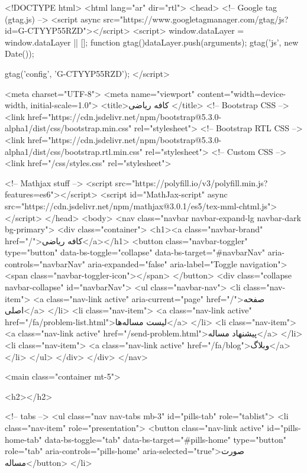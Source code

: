 <!DOCTYPE html>
<html lang="ar" dir="rtl">
<head>
      <!-- Google tag (gtag.js) -->
      <script async src="https://www.googletagmanager.com/gtag/js?id=G-CTYYP55RZD"></script>
      <script>
        window.dataLayer = window.dataLayer || [];
        function gtag(){dataLayer.push(arguments);}
        gtag('js', new Date());

        gtag('config', 'G-CTYYP55RZD');
      </script>

    <meta charset="UTF-8">
    <meta name="viewport" content="width=device-width, initial-scale=1.0">
    <title>کافه ریاضی
    </title>
    <!-- Bootstrap CSS -->
    <link href="https://cdn.jsdelivr.net/npm/bootstrap@5.3.0-alpha1/dist/css/bootstrap.min.css" rel="stylesheet">
    <!-- Bootstrap RTL CSS -->
    <link href="https://cdn.jsdelivr.net/npm/bootstrap@5.3.0-alpha1/dist/css/bootstrap.rtl.min.css" rel="stylesheet">
    <!-- Custom CSS -->
    <link href="/css/styles.css" rel="stylesheet">

    <!-- Mathjax stuff -->
    <script src="https://polyfill.io/v3/polyfill.min.js?features=es6"></script>
    <script id="MathJax-script" async
            src="https://cdn.jsdelivr.net/npm/mathjax@3.0.1/es5/tex-mml-chtml.js"></script>
</head>
<body>
<nav class="navbar navbar-expand-lg navbar-dark bg-primary">
  <div class="container">
    <h1><a class="navbar-brand" href="/">کافه ریاضی</a></h1>
    <button class="navbar-toggler" type="button" data-bs-toggle="collapse" data-bs-target="#navbarNav" aria-controls="navbarNav" aria-expanded="false" aria-label="Toggle navigation">
      <span class="navbar-toggler-icon"></span>
    </button>
    <div class="collapse navbar-collapse" id="navbarNav">
      <ul class="navbar-nav">
        <li class="nav-item">
          <a class="nav-link active" aria-current="page" href="/">صفحه اصلی</a>
        </li>
        <li class="nav-item">
          <a class="nav-link active" href="/fa/problem-list.html">لیست مساله‌ها</a>
        </li>
        <li class="nav-item">
          <a class="nav-link active" href="/send-problem.html">پیشنهاد مساله</a>
        </li>
        <li class="nav-item">
          <a class="nav-link active" href="/fa/blog">وبلاگ</a>
        </li>
      </ul>
    </div>
  </div>
</nav>

    <main class="container mt-5">
        
<h2></h2>


<!-- tabs -->
<ul class="nav nav-tabs mb-3" id="pills-tab" role="tablist">
  <li class="nav-item" role="presentation">
    <button class="nav-link active" id="pills-home-tab" data-bs-toggle="tab" data-bs-target="#pills-home" type="button" role="tab" aria-controls="pills-home" aria-selected="true">صورت مساله</button>
  </li>


